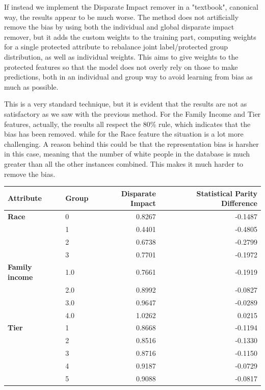 \documentclass{article}
\begin{document}
If instead we implement the Disparate Impact remover in a "textbook", canonical way, the results appear to be much worse. The method does not artificially remove the bias by using both the individual and global disparate impact remover, but it adds the custom weights to the training part, computing weights for a single protected attribute to rebalance joint label/protected group distribution, as well as individual weights. This aims to give weights to the protected features so that the model does not overly rely on those to make predictions, both in an individual and group way to avoid learning from bias as much as possible. 

This is a very standard technique, but it is evident that the results are not as satisfactory as we saw with the previous method. For the Family Income and Tier features, actually, the results all respect the 80\% rule, which indicates that the bias has been removed. while for the Race feature the situation is a lot more challenging. A reason behind this could be that the representation bias is harsher in this case, meaning that the number of white people in the database is much greater than all the other instances combined. This makes it much harder to remove the bias. 

\begin{center}
\begin{tabular}{llrr}
\toprule
\textbf{Attribute} & \textbf{Group} & \textbf{Disparate Impact} & \textbf{Statistical Parity Difference} \\
\midrule
\textbf{Race}
& 0 & 0.8267 & -0.1487 \\
& 1 & 0.4401 & -0.4805 \\
& 2 & 0.6738 & -0.2799 \\
& 3 & 0.7701 & -0.1972 \\
\midrule
\textbf{Family income}
& 1.0 & 0.7661 & -0.1919 \\
& 2.0 & 0.8992 & -0.0827 \\
& 3.0 & 0.9647 & -0.0289 \\
& 4.0 & 1.0262 & 0.0215 \\
\midrule
\textbf{Tier}
& 1 & 0.8668 & -0.1194 \\
& 2 & 0.8516 & -0.1330 \\
& 3 & 0.8716 & -0.1150 \\
& 4 & 0.9187 & -0.0729 \\
& 5 & 0.9088 & -0.0817 \\
\bottomrule
\end{tabular}
\end{center}
\end{document}
